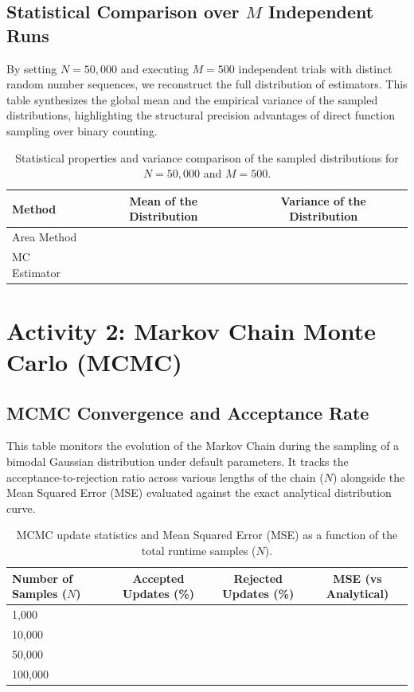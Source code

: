 \documentclass{article}
\begin{document}
\subsection{Statistical Comparison over $M$ Independent Runs}
By setting $N = 50,000$ and executing $M = 500$ independent trials with distinct random number sequences, we reconstruct the full distribution of estimators. This table synthesizes the global mean and the empirical variance of the sampled distributions, highlighting the structural precision advantages of direct function sampling over binary counting.

\begin{table}[htbp]
\centering
\caption{Statistical properties and variance comparison of the sampled distributions for $N = 50,000$ and $M = 500$.}
\label{tab:statistical_comparison}
\begin{tabular}{lcc}
\toprule
Method & Mean of the Distribution & Variance of the Distribution \\
\midrule
Area Method  & & \\
MC Estimator & & \\
\bottomrule
\end{tabular}
\end{table}

\newpage
\section{Activity 2: Markov Chain Monte Carlo (MCMC)}

\subsection{MCMC Convergence and Acceptance Rate}
This table monitors the evolution of the Markov Chain during the sampling of a bimodal Gaussian distribution under default parameters. It tracks the acceptance-to-rejection ratio across various lengths of the chain ($N$) alongside the Mean Squared Error (MSE) evaluated against the exact analytical distribution curve.

\begin{table}[htbp]
\centering
\caption{MCMC update statistics and Mean Squared Error (MSE) as a function of the total runtime samples ($N$).}
\label{tab:mcmc_convergence}
\begin{tabular}{lccc}
\toprule
Number of Samples ($N$) & Accepted Updates (\%) & Rejected Updates (\%) & MSE (vs Analytical) \\
\midrule
1,000   & & & \\
10,000  & & & \\
50,000  & & & \\
100,000 & & & \\
\bottomrule
\end{tabular}
\end{table}
\end{document}

